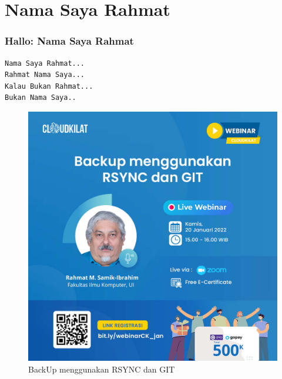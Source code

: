 \documentclass[xcolor=table, notheorems, hyperref={pdfpagelabels=false}]{beamer}
\begin{document}
\section{Nama Saya Rahmat}
\begin{frame}[fragile]
\frametitle{Hallo: Nama Saya Rahmat}
\begin{lstlisting}[basicstyle=\ttfamily\large]
Nama Saya Rahmat...
Rahmat Nama Saya...
Kalau Bukan Rahmat...
Bukan Nama Saya..
\end{lstlisting}
\begin{figure}
\includegraphics[width=0.39\linewidth]{JPG-012}
\caption{BackUp menggunakan RSYNC dan GIT}
\end{figure}
\end{frame}
\end{document}
